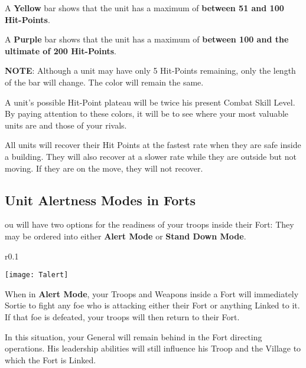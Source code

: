 A \textbf{Yellow} bar shows that the unit has a maximum of \textbf{between 51 and 100 Hit-Points}.

A \textbf{Purple} bar shows that the unit has a maximum of \textbf{between 100 and the ultimate of 200 Hit-Points}.

\textbf{NOTE}: Although a unit may have only 5 Hit-Points remaining, only the length of the bar will change. The color will remain the same.


A unit’s possible Hit-Point plateau will be twice his present Combat Skill Level. By paying attention to these colors, it will be to see where your most valuable units are and those of your rivals.

All units will recover their Hit Points at the fastest rate when they are safe inside a building. They will also recover at a slower rate while they are outside but not moving. If they are on the move, they will not recover.

\subsection{\textsf{Unit Alertness Modes in Forts}}


ou will have two options for the readiness of your troops inside their Fort: They may be ordered into either \textbf{Alert Mode} or \textbf{Stand Down Mode}.

\begin{wrapfigure}{r}{0.1\textwidth}
    \vspace{-20pt}
    \begin{center}
        \texttt{[image: Talert]}
    \end{center}
    \vspace{-20pt}
\end{wrapfigure}

When in \textbf{Alert Mode}, your Troops and Weapons inside a Fort will immediately Sortie to fight any foe who is attacking either their Fort or anything Linked to it. If that foe is defeated, your troops will then return to their Fort.

In this situation, your General will remain behind in the Fort directing operations. His leadership abilities will still influence his Troop and the Village to which the Fort is Linked.

